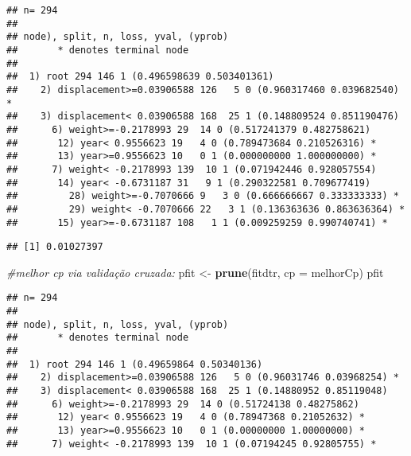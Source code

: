 \documentclass[]{article}
\newenvironment{Shaded}{\begin{snugshade}}{\end{snugshade}}
\newcommand{\KeywordTok}[1]{\textcolor[rgb]{0.13,0.29,0.53}{\textbf{#1}}}
\newcommand{\DataTypeTok}[1]{\textcolor[rgb]{0.13,0.29,0.53}{#1}}
\newcommand{\StringTok}[1]{\textcolor[rgb]{0.31,0.60,0.02}{#1}}
\newcommand{\CommentTok}[1]{\textcolor[rgb]{0.56,0.35,0.01}{\textit{#1}}}
\newcommand{\OperatorTok}[1]{\textcolor[rgb]{0.81,0.36,0.00}{\textbf{#1}}}
\newcommand{\NormalTok}[1]{#1}
\begin{document}
\begin{verbatim}
## n= 294 
## 
## node), split, n, loss, yval, (yprob)
##       * denotes terminal node
## 
##  1) root 294 146 1 (0.496598639 0.503401361)  
##    2) displacement>=0.03906588 126   5 0 (0.960317460 0.039682540) *
##    3) displacement< 0.03906588 168  25 1 (0.148809524 0.851190476)  
##      6) weight>=-0.2178993 29  14 0 (0.517241379 0.482758621)  
##       12) year< 0.9556623 19   4 0 (0.789473684 0.210526316) *
##       13) year>=0.9556623 10   0 1 (0.000000000 1.000000000) *
##      7) weight< -0.2178993 139  10 1 (0.071942446 0.928057554)  
##       14) year< -0.6731187 31   9 1 (0.290322581 0.709677419)  
##         28) weight>=-0.7070666 9   3 0 (0.666666667 0.333333333) *
##         29) weight< -0.7070666 22   3 1 (0.136363636 0.863636364) *
##       15) year>=-0.6731187 108   1 1 (0.009259259 0.990740741) *
\end{verbatim}

\begin{Shaded}
\end{Shaded}

\begin{verbatim}
## [1] 0.01027397
\end{verbatim}

\begin{Shaded}
\begin{Highlighting}[]
\CommentTok{#melhor cp via validação cruzada:}
\NormalTok{pfit <-}\StringTok{ }\KeywordTok{prune}\NormalTok{(fitdtr, }\DataTypeTok{cp =}\NormalTok{ melhorCp)}
\NormalTok{pfit}
\end{Highlighting}
\end{Shaded}

\begin{verbatim}
## n= 294 
## 
## node), split, n, loss, yval, (yprob)
##       * denotes terminal node
## 
##  1) root 294 146 1 (0.49659864 0.50340136)  
##    2) displacement>=0.03906588 126   5 0 (0.96031746 0.03968254) *
##    3) displacement< 0.03906588 168  25 1 (0.14880952 0.85119048)  
##      6) weight>=-0.2178993 29  14 0 (0.51724138 0.48275862)  
##       12) year< 0.9556623 19   4 0 (0.78947368 0.21052632) *
##       13) year>=0.9556623 10   0 1 (0.00000000 1.00000000) *
##      7) weight< -0.2178993 139  10 1 (0.07194245 0.92805755) *
\end{verbatim}
\end{document}
